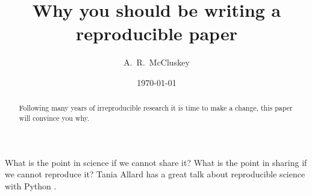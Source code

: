 \documentclass[amsmath,amssymb,twocolumn,superscriptaddress,aps,prl]{revtex4-1}
\begin{document}
\title{Why you should be writing a reproducible paper}

\author{A.~R.~McCluskey}

\date{\today}

\begin{abstract}
  Following many years of irreproducible research it is time to make a change, this paper will convince you why.
\end{abstract}

\maketitle

What is the point in science if we cannot share it?
What is the point in sharing if we cannot reproduce it?
Tania Allard has a great talk about reproducible science with Python \cite{Allard2018}.

\lipsum


\end{document}
